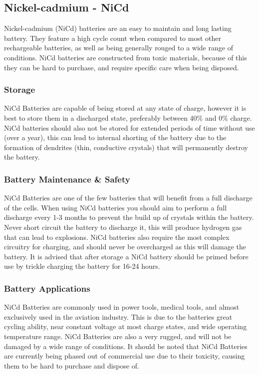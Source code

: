 \documentclass[a4paper,11pt, twocolumn]{article}
\begin{document}
\subsection{Nickel-cadmium - NiCd}

Nickel-cadmium (NiCd) batteries are an easy to maintain and long lasting battery. They feature a high cycle count when compared to most other rechargeable batteries, as well as being generally rouged to a wide range of conditions. NiCd batteries are constructed from toxic materials, because of this they can be hard to purchase, and require specific care when being disposed.

\subsubsection{Storage}

NiCd Batteries are capable of being stored at any state of charge, however it is best to store them in a discharged state, preferably between 40\% and 0\% charge. NiCd batteries should also not be stored for extended periods of time without use (over a year), this can lead to internal shorting of the battery due to the formation of dendrites (thin, conductive crystals) that will permanently destroy the battery\cite{dendrites}. 

\subsubsection{Battery Maintenance \& Safety}

NiCd Batteries are one of the few batteries that will benefit from a full discharge of the cells. When using NiCd batteries you should aim to perform a full discharge every 1-3 months to prevent the build up of crystals within the battery. Never short circuit the battery to discharge it, this will produce hydrogen gas that can lead to explosions. 
NiCd batteries also require the most complex circuitry for charging, and should never be overcharged as this will damage the battery. 
It is advised that after storage a NiCd battery should be primed before use by trickle charging the battery for 16-24 hours.

\subsubsection{Battery Applications}

NiCd Batteries are commonly used in power tools, medical tools, and almost exclusively used in the aviation industry. This is due to the batteries great cycling ability, near constant voltage at most charge states, and wide operating temperature range. NiCd Batteries are also a very rugged, and will not be damaged by a wide range of conditions. It should be noted that NiCd Batteries are currently being phased out of commercial use due to their toxicity, causing them to be hard to purchase and dispose of.  
\end{document}
